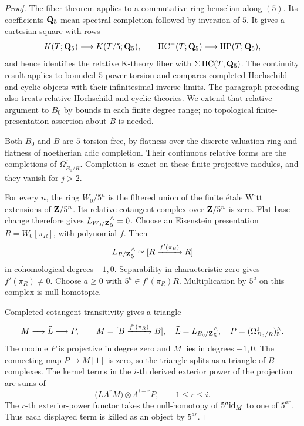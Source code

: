 \begin{proof}
The fiber theorem \cite[Theorem~A]{AMMN} applies to a commutative
ring henselian along \((5)\). Its coefficients \(\mathbf{Q}_5\) mean
spectral completion followed by inversion of \(5\).
It gives a cartesian square with rows
\[
 K(T;\mathbf{Q}_5)\longrightarrow K(T/5;\mathbf{Q}_5),
 \qquad
 \operatorname{HC}^-(T;\mathbf{Q}_5)\longrightarrow\operatorname{HP}(T;\mathbf{Q}_5),
\]
and hence identifies the relative K-theory fiber with
\(\Sigma\operatorname{HC}(T;\mathbf{Q}_5)\).
The continuity result
\cite[Proposition~4.2]{AMMN} applies to bounded \(5\)-power
torsion and compares completed Hochschild and cyclic objects with
their infinitesimal inverse limits.
The paragraph preceding \cite[Proposition~4.10]{AMMN}
also treats relative Hochschild and cyclic theories.
We extend that relative argument to \(B_0\) by bounds in each finite
degree range; no topological finite-presentation assertion about
\(B\) is needed.

Both \(B_0\) and \(B\) are \(5\)-torsion-free, by flatness over the
discrete valuation ring and flatness of noetherian adic completion.
Their continuous relative forms are the completions of
\(\Omega^j_{B_0/R}\). Completion is exact on these finite projective
modules, and they vanish for \(j>2\).

For every \(n\), the ring \(W_0/5^n\) is the filtered union of the
finite \'etale Witt extensions of \(\mathbf{Z}/5^n\).
Its relative cotangent complex over \(\mathbf{Z}/5^n\) is zero.
Flat base change therefore gives
\({L_{W_0/\mathbf{Z}}}^\wedge_5=0\).
Choose an Eisenstein presentation \(R=W_0[\pi_R]\), with polynomial
\(f\). Then
\[
 {L_{R/\mathbf{Z}}}^\wedge_5
   \simeq [R\xrightarrow{f'(\pi_R)}R]
\]
in cohomological degrees \(-1,0\).
Separability in characteristic zero gives \(f'(\pi_R)\ne0\).
Choose \(a\ge0\) with \(5^a\in f'(\pi_R)R\).
Multiplication by \(5^a\) on this complex is null-homotopic.

Completed cotangent transitivity gives a triangle
\[
 M\longrightarrow \widehat L\longrightarrow P,
 \qquad
 M=[B\xrightarrow{f'(\pi_R)}B],\quad
 \widehat L={L_{B_0/\mathbf{Z}}}^\wedge_5,\quad
 P=(\Omega^1_{B_0/R})^\wedge_5.
\]
The module \(P\) is projective in degree zero and \(M\) lies in
degrees \(-1,0\).
The connecting map \(P\to M[1]\) is zero, so the triangle splits
as a triangle of \(B\)-complexes.
The kernel terms in the \(i\)-th derived exterior power of the
projection are sums of
\[
 \bigl(L\!\Lambda^rM\bigr)\otimes\Lambda^{i-r}P,
 \qquad 1\le r\le i.
\]
The \(r\)-th exterior-power functor takes the null-homotopy of
\(5^a\mathrm{id}_M\) to one of \(5^{ar}\).
Thus each displayed term is killed as an object by \(5^{ar}\).


\end{proof}

